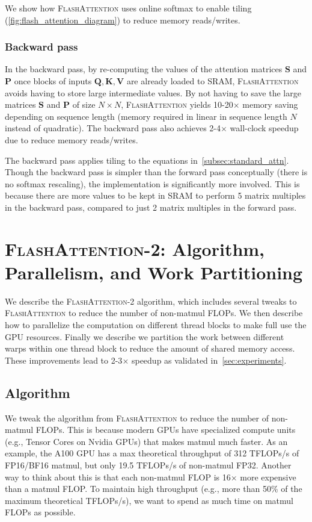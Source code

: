 We show how \textsc{FlashAttention} uses online softmax to enable tiling
(\ref{fig:flash_attention_diagram}) to reduce memory reads/writes.

\subsubsection{Backward pass} In the backward pass, by re-computing the values of the attention matrices $\mathbf{S}$
and $\mathbf{P}$ once blocks of inputs $\mathbf{Q}, \mathbf{K}, \mathbf{V}$ are already loaded to SRAM,
\textsc{FlashAttention} avoids having to store large intermediate values. By not having to save the large matrices $\mathbf{S}$ and $\mathbf{P}$ of size $N \times N$,
\textsc{FlashAttention} yields 10-20$\times$ memory saving depending on sequence length (memory required in linear in sequence length $N$ instead of quadratic). The backward pass also achieves 2-4$\times$ wall-clock speedup due to reduce memory reads/writes.

The backward pass applies tiling to the equations in~\ref{subsec:standard_attn}.
Though the backward pass is simpler than the forward pass conceptually (there is no softmax rescaling), the implementation is significantly more involved. This is because there are more values to be kept in SRAM to perform 5 matrix multiples in the backward pass, compared to just 2 matrix multiples in the forward pass.

\section{\textsc{FlashAttention-2}: Algorithm, Parallelism, and Work Partitioning}
\label{sec:algo}

We describe the \textsc{FlashAttention-2} algorithm, which includes several tweaks to \textsc{FlashAttention}
to reduce the number of non-matmul FLOPs. We then describe how to parallelize the computation on different thread blocks to make full use the GPU resources. Finally we describe we partition the work between different warps within one thread block to reduce the amount of shared memory access. These improvements lead to 2-3$\times$ speedup as validated in~\ref{sec:experiments}.

\subsection{Algorithm}
\label{subsec:algo}

We tweak the algorithm from \textsc{FlashAttention} to reduce the number of non-matmul FLOPs. This is because modern GPUs have specialized compute units (e.g., Tensor Cores on Nvidia GPUs) that makes matmul much faster. As an example, the A100 GPU has a max theoretical throughput of 312 TFLOPs/s of FP16/BF16 matmul, but only 19.5 TFLOPs/s of non-matmul FP32. Another way to think about this is that each non-matmul FLOP is 16$\times$ more expensive than a matmul FLOP. To maintain high throughput (e.g., more than 50\% of the maximum theoretical TFLOPs/s), we want to spend as much time on matmul FLOPs as possible.


